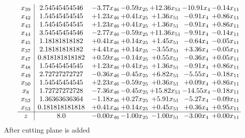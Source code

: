 \documentclass[8pt]{article}
\begin{document}
\[\begin{array}{c| c c@{\hskip 2pt} c@{\hskip 2pt} c@{\hskip 2pt} c@{\hskip 2pt} c@{\hskip 2pt} }
 x_{39}   &  2.54545454546 & -3.77 x_{46} & -0.59 x_{25} & + 12.36 x_{51} & -10.91 x_{4} & -0.14 x_{11}\\
 x_{42}   &  1.54545454545 & +  1.23 x_{46} & +  0.41 x_{25} & +  1.36 x_{51} & -0.91 x_{4} & +  0.86 x_{11}\\
 x_{43}   &  1.54545454545 & +  1.23 x_{46} & +  0.41 x_{25} & +  1.36 x_{51} & -0.91 x_{4} & +  0.86 x_{11}\\
 x_{44}   &  3.54545454546 & -2.77 x_{46} & -0.59 x_{25} & + 11.36 x_{51} & -9.91 x_{4} & -0.14 x_{11}\\
 x_{45}   &  1.18181818182 & +  0.41 x_{46} & +  0.14 x_{25} & +  1.45 x_{51} & -0.64 x_{4} & -0.05 x_{11}\\
 x_{37}   &  2.18181818182 & +  4.41 x_{46} & +  0.14 x_{25} & -3.55 x_{51} & +  3.36 x_{4} & -0.05 x_{11}\\
 x_{47}   &  0.818181818182 & +  0.59 x_{46} & -0.14 x_{25} & +  0.55 x_{51} & -0.36 x_{4} & +  0.05 x_{11}\\
 x_{48}   &  1.54545454545 & +  1.23 x_{46} & +  0.41 x_{25} & +  1.36 x_{51} & -0.91 x_{4} & +  0.86 x_{11}\\
 x_{49}   &  2.72727272727 & -0.36 x_{46} & -0.45 x_{25} & +  6.82 x_{51} & -5.55 x_{4} & -0.18 x_{11}\\
 x_{50}   &  1.54545454545 & +  2.23 x_{46} & -0.59 x_{25} & +  0.36 x_{51} & +  0.09 x_{4} & +  0.86 x_{11}\\
 x_{8}   &  1.72727272728 & -7.36 x_{46} & -0.45 x_{25} & + 15.82 x_{51} & -14.55 x_{4} & -0.18 x_{11}\\
 x_{52}   &  1.36363636364 & -1.18 x_{46} & +  0.27 x_{25} & +  5.91 x_{51} & -5.27 x_{4} & -0.09 x_{11}\\
 x_{53}   &  0.181818181818 & +  0.41 x_{46} & +  0.14 x_{25} & +  0.45 x_{51} & +  0.36 x_{4} & +  0.95 x_{11}\\
\hline
z    &  8.0 & -0.00 x_{46} & -1.00 x_{25} & -1.00 x_{51} & -3.00 x_{4} & +  0.00 x_{11}\\
\end{array}\]
 After cutting plane is added 
\end{document}
